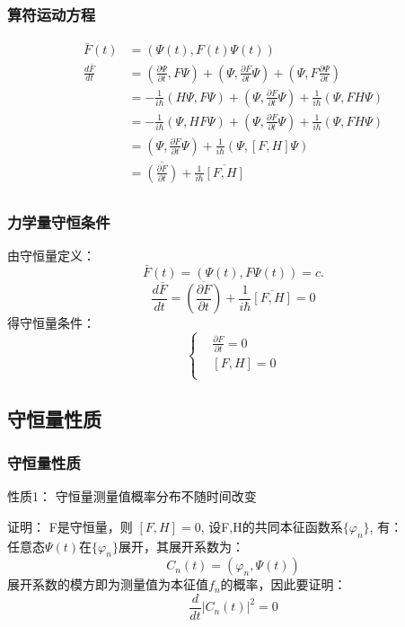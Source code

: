 \begin{frame} [allowframebreaks=]
    \frametitle{算符运动方程}    
        \begin{equation*}
            \begin{split} 
            \bar{F}(t)&=(\Psi(t), F(t)\Psi(t)) \\
            \frac{d\bar{F}}{dt}&=(\frac{\partial\Psi }{\partial t}, F\Psi) +(\Psi, \frac{\partial F }{\partial t}\Psi) +(\Psi, F\frac{\partial\Psi }{\partial t}) \\
            &= - \frac{1}{i\hbar} (H\Psi, F\Psi)+(\Psi, \frac{\partial F }{\partial t}\Psi) + \frac{1}{i\hbar} (\Psi, FH\Psi) \\
            &= - \frac{1}{i\hbar} (\Psi, HF\Psi)+(\Psi, \frac{\partial F }{\partial t}\Psi) + \frac{1}{i\hbar} (\Psi, FH\Psi) \\
            &= (\Psi, \frac{\partial F }{\partial t}\Psi)  +\frac{1}{i\hbar} (\Psi, [F,H]\Psi) \\
            &=\overline{(\frac{\partial F }{\partial t})}  +\frac{1}{i\hbar} \overline{[F,H]} \\
            \end{split}  
        \end{equation*}  
\end{frame} 

\begin{frame} [allowframebreaks=]
        \frametitle{力学量守恒条件} 
        由守恒量定义：   
        $$ \bar{F}(t)=(\Psi(t), F\Psi(t)) =c.  $$
        $$\frac{d\bar{F}}{dt}=\overline{(\frac{\partial F }{\partial t})}  +\frac{1}{i\hbar} \overline{[F,H]}=0$$
        得守恒量条件：
        $$\left\{\begin{aligned}
            &\frac{\partial F }{\partial t}=0\\
            &[F,H]=0 \\
        \end{aligned} \right. $$
\end{frame}

\subsection{守恒量性质}

\begin{frame} 
    \frametitle{守恒量性质} 
    \begin{tcolorbox1}{性质1：}
        守恒量测量值概率分布不随时间改变
    \end{tcolorbox1}
    \alert{证明：} F是守恒量，则 $[F,H]=0$, 设F,H的共同本征函数系$\{\varphi_n\}$, 有：\\ 
    任意态$\Psi(t)$在$\{\varphi_n\}$展开，其展开系数为：
    $$C_n(t)=(\varphi_n, \Psi(t))$$
    展开系数的模方即为测量值为本征值$f_n$的概率，因此要证明：
    $$\frac{d}{dt} |C_n(t)|^2=0$$
\end{frame}

